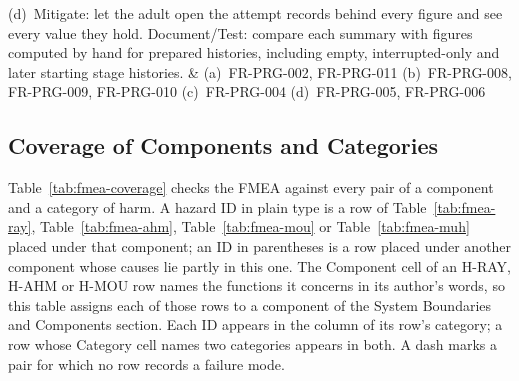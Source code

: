 \documentclass{article}
\newenvironment{fmealandscape}{
    \begin{landscape}
    \pagestyle{empty}
    \AddToShipoutPictureFG{ \AtPageLowerLeft{
        \put(\LenToUnit{\dimexpr\paperwidth-1.5cm\relax},
        \LenToUnit{.5\paperheight}){ \makebox(0,0)[c]{\rotatebox{90}{\thepage}}
        } } } }{
    \end{landscape}
    \ClearShipoutPictureFG }
\begin{document}
\begin{fmealandscape}
{\begin{longtable}
(d)~Mitigate: let the adult open the attempt records behind every figure and see
every value they hold. Document/Test: compare each summary with figures computed
by hand for prepared histories, including empty, interrupted-only and later
starting stage histories. & (a)~FR-PRG-002, FR-PRG-011\newline
(b)~FR-PRG-008, FR-PRG-009, FR-PRG-010\newline
(c)~FR-PRG-004\newline
(d)~FR-PRG-005, FR-PRG-006 \\
\end{longtable}
}
\end{fmealandscape}

\subsection{Coverage of Components and Categories}
\label{sec:fmea-coverage}

Table~\ref{tab:fmea-coverage} checks the FMEA against every pair of a component
and a category of harm. A hazard ID in plain type is a row of
Table~\ref{tab:fmea-ray}, Table~\ref{tab:fmea-ahm}, Table~\ref{tab:fmea-mou} or
Table~\ref{tab:fmea-muh} placed under that component; an ID in parentheses is a
row placed under another component whose causes lie partly in this one. The
Component cell of an H-RAY, H-AHM or H-MOU row names the functions it concerns
in its author's words, so this table assigns each of those rows to a component
of the System Boundaries and Components section. Each ID appears in the column
of its row's category; a row whose Category cell names two categories appears in
both. A dash marks a pair for which no row records a failure mode.
\end{document}
